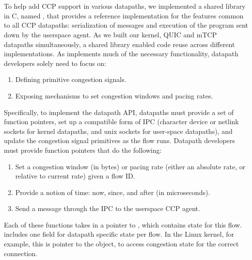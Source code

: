 \section{}
\label{sec:impl:libccp}
To help add CCP support in various datapaths, we implemented a shared library in C, named , that provides a reference implementation for the features common to all CCP datapaths: serialization of messages and execution of the program sent down by the userspace agent.
As we built our kernel, QUIC and mTCP datapaths simultaneously, a shared library enabled code reuse across different implementations.
As  implements much of the necessary functionality, datapath developers solely need to focus on: 
\begin{enumerate}
    \item Defining primitive congestion signals.
    \item Exposing mechanisms to set congestion windows and pacing rates.
\end{enumerate}
Specifically, to implement the datapath API, datapaths must provide a set of function pointers, set up a compatible form of IPC (character device or netlink sockets for kernel datapaths, and unix sockets for user-space datapaths), and update the congestion signal primitives as the flow runs.
Datapath developers must provide function pointers that do the following:
\begin{enumerate}
    \item Set a congestion window (in bytes)  or pacing rate (either an absolute rate, or relative to current rate) given a flow ID.
    \item Provide a notion of time: now, since, and after (in microseconds).
    \item Send a message through the IPC to the userspace CCP agent.
\end{enumerate}
Each of these functions takes in a pointer to , which contains state for this flow.  includes one field for datapath specific state per flow. In the Linux kernel, for example, this is pointer to the  object, to access congestion state for the correct connection.

